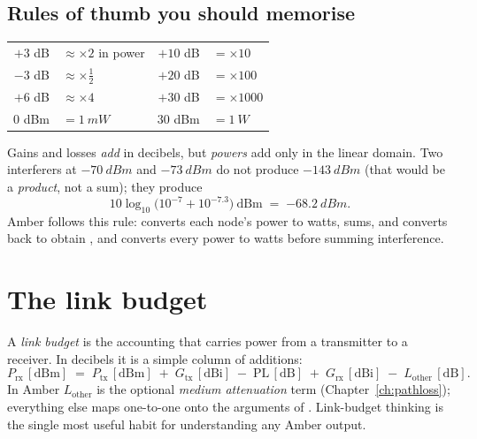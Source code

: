 \subsection{Rules of thumb you should memorise}

\begin{center}
\small
\begin{tabular}{@{}rl@{\qquad\qquad}rl@{}}
\toprule
$+3$ dB & $\approx\times2$ in power & $+10$ dB & $=\times10$\\
$-3$ dB & $\approx\times\tfrac12$ & $+20$ dB & $=\times100$\\
$+6$ dB & $\approx\times4$ & $+30$ dB & $=\times1000$\\
$0$ dBm & $=\SI{1}{mW}$ & $30$ dBm & $=\SI{1}{W}$\\
\bottomrule
\end{tabular}
\end{center}

\begin{reality}
Gains and losses \emph{add} in decibels, but \emph{powers} add only in the
linear domain. Two interferers at $\SI{-70}{dBm}$ and $\SI{-73}{dBm}$ do not
produce $\SI{-143}{dBm}$ (that would be a \emph{product}, not a sum); they
produce
\[
 10\log_{10}\!\big(10^{-7}+10^{-7.3}\big)\ \mathrm{dBm}\;=\;\SI{-68.2}{dBm}.
\]
Amber follows this rule:  converts each node's
power to watts, sums, and converts back to obtain , and
 converts every power to watts before summing interference.
\end{reality}

\section{The link budget}
\label{sec:linkbudget}

A \emph{link budget} is the accounting that carries power from a transmitter to a
receiver. In decibels it is a simple column of additions:
\begin{equation}
 P_{\mathrm{rx}}\,[\mathrm{dBm}] \;=\; P_{\mathrm{tx}}\,[\mathrm{dBm}] \;+\; G_{\mathrm{tx}}\,[\mathrm{dBi}] \;-\; \mathrm{PL}\,[\mathrm{dB}] \;+\; G_{\mathrm{rx}}\,[\mathrm{dBi}]
 \;-\; L_{\mathrm{other}}\,[\mathrm{dB}].
\label{eq:linkbudget}
\end{equation}
In Amber $L_{\mathrm{other}}$ is the optional \emph{medium attenuation} term (Chapter~\ref{ch:pathloss}); everything
else maps one-to-one onto the arguments of .
Link-budget thinking is the single most useful habit for understanding any
Amber output.

